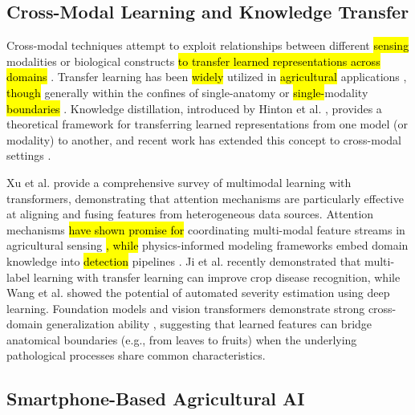 \documentclass[utf8]{FrontiersinHarvard}
\newenvironment{revblock}{}{}
\begin{document}
\subsection{Cross-Modal Learning and Knowledge Transfer}

Cross-modal techniques attempt to exploit relationships between different \hl{sensing} modalities or biological constructs \hl{to transfer learned representations across domains} \cite{zhuang2020}. Transfer learning has been \hl{widely} utilized in \hl{agricultural} applications \cite{chen2020_transfer,tan2018}, \hl{though} generally within the confines of single-anatomy or \hl{single-}modality \hl{boundaries} \cite{barbedo2019}.
\begin{revblock}Knowledge distillation, introduced by Hinton et al. \cite{hinton2015}, provides a theoretical framework for transferring learned representations from one model (or modality) to another, and recent work has extended this concept to cross-modal settings \cite{li2023_kd}.

Xu et al. \cite{xu2023} provide a comprehensive survey of multimodal learning with transformers, demonstrating that attention mechanisms are particularly effective at aligning and fusing features from heterogeneous data sources.\end{revblock} Attention mechanisms \hl{have shown promise for} coordinating multi-modal feature streams in agricultural sensing \cite{niu2021,guo2022}\hl{, while} physics-informed modeling frameworks embed domain knowledge into \hl{detection} pipelines \cite{karniadakis2021}. \begin{revblock}Ji et al. \cite{ji2023} recently demonstrated that multi-label learning with transfer learning can improve crop disease recognition, while Wang et al. \cite{wang2022_synthetic} showed the potential of automated severity estimation using deep learning.\end{revblock} Foundation models and vision transformers demonstrate strong cross-domain generalization ability \cite{vaswani2017,dosovitskiy2021}, suggesting that learned features can bridge anatomical boundaries (e.g., from leaves to fruits) when the underlying pathological processes share common characteristics.

\subsection{Smartphone-Based Agricultural AI}
\end{document}
